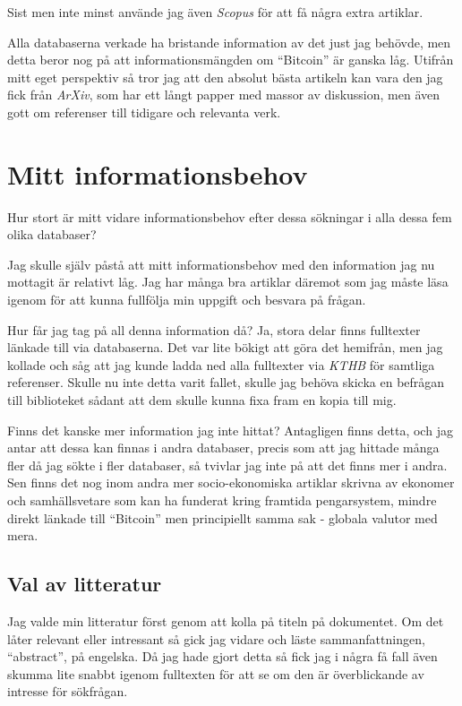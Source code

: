 \documentclass[a4paper,11pt,exjobb]{kth-mag}
\begin{document}
Sist men inte minst använde jag även \textit{Scopus} för att få några extra artiklar. 

Alla databaserna verkade ha bristande information av det just jag behövde, men detta beror nog på att informationsmängden om ``Bitcoin'' är ganska låg. Utifrån mitt eget perspektiv så tror jag att den absolut bästa artikeln kan vara den jag fick från \textit{ArXiv}, som har ett långt papper med massor av diskussion, men även gott om referenser till tidigare och relevanta verk.

\section{Mitt informationsbehov}
Hur stort är mitt vidare informationsbehov efter dessa sökningar i alla dessa fem olika databaser?

Jag skulle själv påstå att mitt informationsbehov med den information jag nu mottagit är relativt låg. Jag har många bra artiklar däremot som jag måste läsa igenom för att kunna fullfölja min uppgift och besvara på frågan. 

Hur får jag tag på all denna information då? Ja, stora delar finns fulltexter länkade till via databaserna. Det var lite bökigt att göra det hemifrån, men jag kollade och såg att jag kunde ladda ned alla fulltexter via \textit{KTHB} för samtliga referenser. Skulle nu inte detta varit fallet, skulle jag behöva skicka en befrågan till biblioteket sådant att dem skulle kunna fixa fram en kopia till mig.

Finns det kanske mer information jag inte hittat?
Antagligen finns detta, och jag antar att dessa kan finnas i andra databaser, precis som att jag hittade många fler då jag sökte i fler databaser, så tvivlar jag inte på att det finns mer i andra. Sen finns det nog inom andra mer socio-ekonomiska artiklar skrivna av ekonomer och samhällsvetare som kan ha funderat kring framtida pengarsystem, mindre direkt länkade till ``Bitcoin'' men principiellt samma sak - globala valutor med mera. 

\subsection{Val av litteratur}
Jag valde min litteratur först genom att kolla på titeln på dokumentet. Om det låter relevant eller intressant så gick jag vidare och läste sammanfattningen, ``abstract'', på engelska. Då jag hade gjort detta så fick jag i några få fall även skumma lite snabbt igenom fulltexten för att se om den är överblickande av intresse för sökfrågan.
\end{document}
